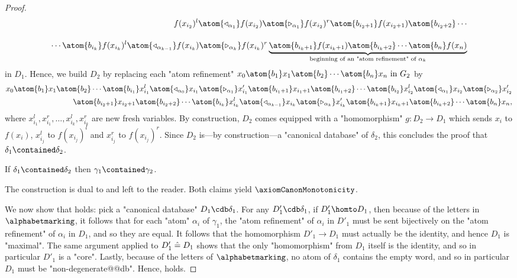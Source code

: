 \begin{proof}
\begin{align*}
{		}
		f(x_{i_2})^l 
		\atom{\triangleleft_{\alpha_{1}}} f(x_{i_2}) \atom{\triangleright_{\alpha_{1}}} f(x_{i_2})^r 
		\atom{b_{i_2+1}} f(x_{i_{2}+1}) \atom{b_{i_2+2}} \cdots
		\\[1em] 
		\cdots \atom{b_{i_k}}
		f(x_{i_k})^l \atom{\triangleleft_{\alpha_{k-1}}} f(x_{i_k}) \atom{\triangleright_{\alpha_{k}}} f(x_{i_k})^r
		\underbrace{\atom{b_{i_k+1}} f(x_{i_{k}+1}) \atom{b_{i_k+2}} \cdots \atom{b_n} f(x_n)}_{
			\text{beginning of an "atom refinement" of $\alpha_k$}
		}
	\end{align*}
	in $D_1$. Hence, we build $D_2$ by replacing each "atom refinement"
	$
		x_0 \atom{b_1} x_1 \atom{b_2} \cdots \atom{b_n} x_n
		\text{ in } G_2
	$
	by
	\begin{align*}
		x_0 \atom{b_1} x_1 \atom{b_2} \cdots \atom{b_{i_1}}
		x_{i_1}^l \atom{\triangleleft_{\alpha_0}} x_{i_1} \atom{\triangleright_{\alpha_{1}}} x_{i_1}'
		\atom{b_{i_1+1}} x_{i_{1}+1} \atom{b_{i_1+2}} \cdots \atom{b_{i_2}}
		x_{i_2}^l \atom{\triangleleft_{\alpha_1}} x_{i_2} \atom{\triangleright_{\alpha_{2}}} x_{i_2}'\\
		\atom{b_{i_2+1}} x_{i_{2}+1} \atom{b_{i_2+2}} \cdots \atom{b_{i_k}}
		x_{i_k}^l \atom{\triangleleft_{\alpha_{k-1}}} x_{i_k} \atom{\triangleright_{\alpha_{k}}} x_{i_k}'
		\atom{b_{i_k+1}} x_{i_{k}+1} \atom{b_{i_k+2}} \cdots \atom{b_n} x_n,
	\end{align*}
	where $x_{i_1}^l, x_{i_1}^r, \hdots, x_{i_k}^l, x_{i_k}^r$ are new fresh variables.
	By construction, $D_2$ comes equipped with a "homomorphism" 
	$g\colon D_2 \to D_1$ which sends $x_i$ to $f(x_i)$,
	$x_{i_j}^l$ to $f(x_{i_j})^l$ and $x_{i_j}^r$ to $f(x_{i_j})^r$. Since $D_2$ is---by
	construction---a "canonical database" of $\delta_2$, this concludes the proof that 
	$\delta_1 \contained \delta_2$.

	\begin{claim}
		\AP\label{claim:canonization-multigraph-monotonic-r-to-l}
		If $\delta_1 \contained \delta_2$ then $\gamma_1 \contained \gamma_2$.
	\end{claim}

	The construction is dual to  and left to the
	reader. Both claims yield $\axiomCanonMonotonicity$.

	We now show that \axiomStrongCanonCore{} holds: pick a "canonical database" $D_1 \cdb \delta_1$.
	For any $D'_1 \cdb \delta_1$, if $D'_1 \homto D_1$, then because of the letters in $\alphabetmarking$,
	it follows that for each "atom" $\alpha_i$ of $\gamma_1$, the "atom refinement" of
	$\alpha_i$ in $D'_1$ must be sent bijectively on the "atom refinement" of $\alpha_i$ in $D_1$,
	and so they are equal. It follows that the homomorphism $D'_1 \to D_1$ must actually be the identity,
	and hence $D_1$ is "maximal".
	The same argument applied to $D'_1 \mathrel{\hat{=}} D_1$ shows that the only "homomorphism" from $D_1$ itself
	is the identity, and so in particular $D'_1$ is a "core".
	Lastly, because of the letters of $\alphabetmarking$, no atom of $\delta_1$ contains the empty word,
	and so in particular $D_1$ must be "non-degenerate@@db". Hence, \axiomStrongCanonCore{} holds.


\end{proof}
